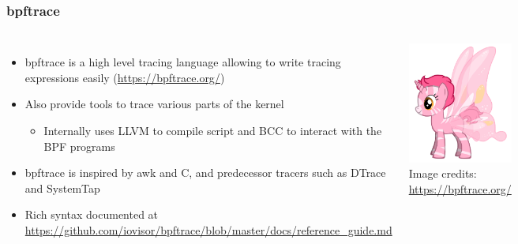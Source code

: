 \begin{frame}[fragile]
  \frametitle{bpftrace}
    \begin{columns}
      \begin{itemize}
        \item bpftrace is a high level tracing language allowing to write tracing
              expressions easily (\url{https://bpftrace.org/})
        \item Also provide tools to trace various parts of the kernel
        \begin{itemize}
          \item Internally uses LLVM to compile script and BCC to interact with the BPF programs
        \end{itemize}
        \item bpftrace is inspired by awk and C, and predecessor tracers such as DTrace and SystemTap
        \item Rich syntax documented at \url{https://github.com/iovisor/bpftrace/blob/master/docs/reference_guide.md}
      \end{itemize}
    \vspace{0.5cm}
    \includegraphics[height=0.2\textheight]{slides/debugging-system-wide-profiling/bpftrace.png}\\ 
    \tiny Image credits: \url{https://bpftrace.org/}
  \end{columns}
\end{frame}

